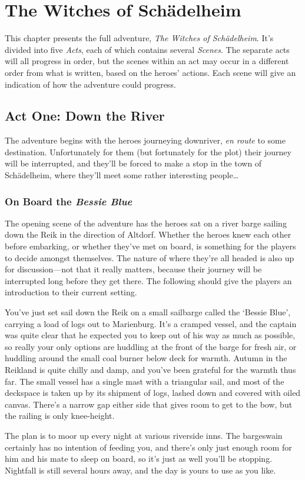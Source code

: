 \chapter{The Witches of Sch{\"a}delheim}\label{ch:adventure}

This chapter presents the full adventure, \textit{The Witches of
Sch{\"a}delheim}. It's divided into five \textit{Acts}, each of which contains
several \textit{Scenes}. The separate acts will all progress in order, but
the scenes within an act may occur in a different order from what is written,
based on the heroes' actions. Each scene will give an indication of how the
adventure could progress.


\section{Act One: Down the River}\label{act1}
The adventure begins with the heroes journeying downriver, \textit{en route} to
some destination. Unfortunately for them (but fortunately for the plot) their
journey will be interrupted, and they'll be forced to make a stop in the town
of Sch{\"a}delheim, where they'll meet some rather interesting people\ldots

\subsection{On Board the \textit{Bessie Blue}}\label{act1scene1}
The opening scene of the adventure has the heroes sat on a river barge sailing
down the Reik in the direction of Altdorf. Whether the heroes knew each other
before embarking, or whether they've met on board, is something for the players
to decide amongst themselves. The nature of where they're all headed is also
up for discussion---not that it really matters, because their journey will be
interrupted long before they get there. The following should give the players an 
introduction to their current setting.

\begin{callout}
You've just set sail down the Reik on a small sailbarge called the `Bessie
Blue', carrying a load of logs out to Marienburg. It's a cramped vessel, and the
captain was quite clear that he expected you to keep out of his way as much as
possible, so really your only options are huddling at the front of the barge
for fresh air, or huddling around the small coal burner below deck for warmth.
Autumn in the Reikland is quite chilly and damp, and you've been grateful for
the warmth thus far. The small vessel has a single mast with a triangular sail,
and most of the deckspace is taken up by its shipment of logs, lashed down and
covered with oiled canvas. There's a narrow gap either side that gives room to
get to the bow, but the railing is only knee-height.

The plan is to moor up every night at various riverside inns. The bargeswain
certainly has no intention of feeding you, and there's only just enough room for
him and his mate to sleep on board, so it's just as well you'll be stopping.
Nightfall is still several hours away, and the day is yours to use as you like.
\end{callout}

